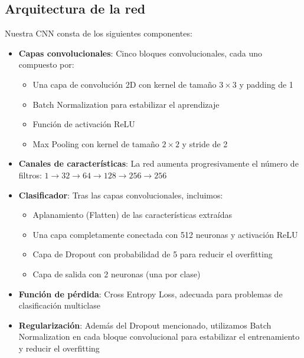 \documentclass[es]{uc3mreport}
\begin{document}
\begin{report}
    \subsection{Arquitectura de la red}
    
    Nuestra CNN consta de los siguientes componentes:
    
    \begin{itemize}
        \item \textbf{Capas convolucionales}: Cinco bloques convolucionales, cada uno compuesto por:
        \begin{itemize}
            \item Una capa de convolución 2D con kernel de tamaño $3 \times 3$ y padding de 1
            \item Batch Normalization \cite{ioffe2015batchnormalizationacceleratingdeep} para estabilizar el aprendizaje
            \item Función de activación ReLU
            \item Max Pooling con kernel de tamaño $2 \times 2$ y stride de 2
        \end{itemize}
        
        \item \textbf{Canales de características}: La red aumenta progresivamente el número de filtros: $1 \rightarrow 32 \rightarrow 64 \rightarrow 128 \rightarrow 256 \rightarrow 256$
        
        \item \textbf{Clasificador}: Tras las capas convolucionales, incluimos:
        \begin{itemize}
            \item Aplanamiento (Flatten) de las características extraídas
            \item Una capa completamente conectada con 512 neuronas y activación ReLU
            \item Capa de Dropout con probabilidad de 5 para reducir el overfitting
            \item Capa de salida con 2 neuronas (una por clase)
        \end{itemize}
        
        \item \textbf{Función de pérdida}: Cross Entropy Loss, adecuada para problemas de clasificación multiclase
        
        \item \textbf{Regularización}: Además del Dropout mencionado, utilizamos Batch Normalization en cada bloque convolucional para estabilizar el entrenamiento y reducir el overfitting
    \end{itemize}
    

\end{report}
\end{document}
